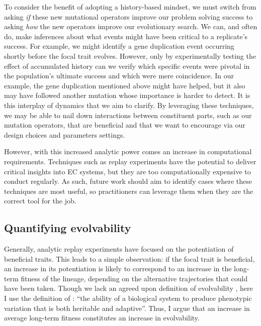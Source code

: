 To consider the benefit of adopting a history-based mindset, we must switch from asking \textit{if} these new mutational operators improve our problem solving success to asking \textit{how} the new operators improve our evolutionary search.
We can, and often do, make inferences about what events might have been critical to a replicate's success. 
For example, we might identify a gene duplication event occurring shortly before the focal trait evolves.
However, only by experimentally testing the effect of accumulated history can we verify which specific events were pivotal in the population's ultimate success and which were mere coincidence. 
In our example, the gene duplication mentioned above might have helped, but it also may have followed another mutation whose importance is harder to detect. 
It is this interplay of dynamics that we aim to clarify. 
By leveraging these techniques, we may be able to nail down interactions between constituent parts, such as our mutation operators, that are beneficial and that we want to encourage via our design choices and parameters settings. 

However, with this increased analytic power comes an increase in computational requirements. 
Techniques such as replay experiments have the potential to deliver critical insights into EC systems, but they are too computationally expensive to conduct regularly. 
As such, future work should aim to identify cases where these techniques are most useful, so practitioners can leverage them when they are the correct tool for the job. 


\subsection{Quantifying evolvability}

Generally, analytic replay experiments have focused on the potentiation of beneficial traits. 
This leads to a simple observation: if the focal trait is beneficial, an increase in its potentiation is likely to correspond to an increase in the long-term fitness of the lineage, depending on the alternative trajectories that could have been taken.
Though we lack an agreed upon definition of evolvability \citep{pigliucciEvolvabilityEvolvable2008}, here I use the definition of \citet{payneCausesEvolvabilityTheir2019}: ``the ability of a biological system to produce phenotypic variation that is both heritable and adaptive''.
Thus, I argue that an increase in average long-term fitness constitutes an increase in evolvability.

